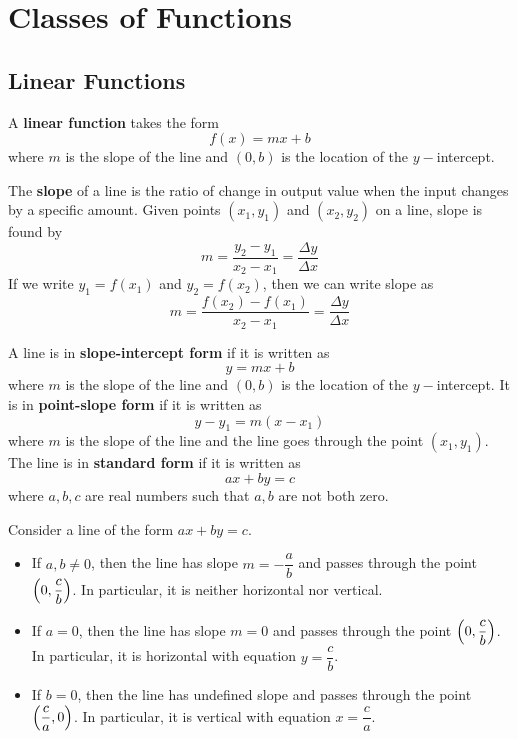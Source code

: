 \documentclass[notes]{subfiles}
\begin{document}
	\setcounter{section}{2}
	\fancyhead[LO,RE]{\bfseries \currentname}
	\fancyfoot[C]{{}}
	\fancyfoot[LO,RE]{\large \thepage}	%

\section*{Classes of Functions}\label{cs12}
	\subsection*{Linear Functions}
		\begin{defn}
			A \textbf{linear function} takes the form 
			\[f(x) = mx + b\]
			where \(m\) is the slope of the line and \((0,b)\) is the location of the \(y-\)intercept.
		\end{defn}
		
		\begin{defn}[Slope]
			The \textbf{slope} of a line is the ratio of change in output value when the input changes by a specific amount. Given points \((x_1,y_1)\) and \((x_2,y_2)\) on a line, slope is found by
			\[m = \dfrac{y_2-y_1}{x_2-x_1} = \dfrac{\Delta y}{\Delta x}\]
			If we write \(y_1 = f(x_1)\) and \(y_2 = f(x_2)\), then we can write slope as
			\[m = \dfrac{f(x_2)-f(x_1)}{x_2-x_1} = \dfrac{\Delta y}{\Delta x}\]
		\end{defn}
		
		\begin{rmk}
			A line is in \textbf{slope-intercept form} if it is written as
			\[y = mx + b\]
			where \(m\) is the slope of the line and \((0,b)\) is the location of the \(y-\)intercept. It is in \textbf{point-slope form} if it is written as
			\[y-y_1 = m(x-x_1)\]
			where \(m\) is the slope of the line and the line goes through the point \((x_1,y_1)\). The line is in \textbf{standard form} if it is written as
			\[ax + by = c\]
			where \(a,b,c\) are real numbers such that \(a,b\) are not both zero.
		\end{rmk}
		
		\begin{rmk}
			Consider a line of the form \(ax + by = c\).
			\begin{itemize}
				\item If \(a,b \neq 0\), then the line has slope \(m = -\dfrac{a}{b}\) and passes through the point \(\left( 0,\dfrac{c}{b}\right)\). In particular, it is neither horizontal nor vertical.
				\item If \(a = 0\), then the line has slope \(m = 0\) and passes through the point \(\left( 0,\dfrac{c}{b}\right)\). In particular, it is horizontal with equation \(y = \dfrac{c}{b}\).
				\item If \(b = 0\), then the line has undefined slope and passes through the point \(\left( \dfrac{c}{a},0\right)\). In particular, it is vertical with equation \(x = \dfrac{c}{a}\).
			\end{itemize}
		\end{rmk}
		
\end{document}
